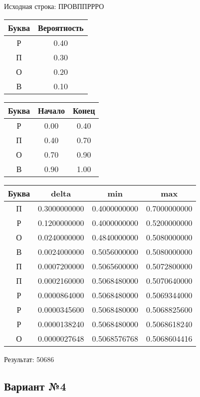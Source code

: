 \documentclass[a4paper, 12pt]{article}
\begin{document}
Исходная строка: ПРОВППРРРО\
\begin{center}
 \begin{tabular}{ |c|c| } 
  \hline
     Буква & Вероятность \\ \hline
Р & 0.40\\\hline
П & 0.30\\\hline
О & 0.20\\\hline
В & 0.10
\\ \hline \end{tabular}
\end{center}
\begin{center}
 \begin{tabular}{ |c|c|c| } 
  \hline
     Буква & Начало & Конец \\ \hline
Р & 0.00 & 0.40\\\hline
П & 0.40 & 0.70\\\hline
О & 0.70 & 0.90\\\hline
В & 0.90 & 1.00
\\ \hline \end{tabular}
\end{center}
\begin{center}
 \begin{tabular}{ |c|c|c|c| } 
  \hline
     Буква & delta & min & max \\ \hline
П & 0.3000000000 & 0.4000000000 & 0.7000000000\\\hline
Р & 0.1200000000 & 0.4000000000 & 0.5200000000\\\hline
О & 0.0240000000 & 0.4840000000 & 0.5080000000\\\hline
В & 0.0024000000 & 0.5056000000 & 0.5080000000\\\hline
П & 0.0007200000 & 0.5065600000 & 0.5072800000\\\hline
П & 0.0002160000 & 0.5068480000 & 0.5070640000\\\hline
Р & 0.0000864000 & 0.5068480000 & 0.5069344000\\\hline
Р & 0.0000345600 & 0.5068480000 & 0.5068825600\\\hline
Р & 0.0000138240 & 0.5068480000 & 0.5068618240\\\hline
О & 0.0000027648 & 0.5068576768 & 0.5068604416
\\ \hline \end{tabular}
\end{center}
Результат: 50686
\pagebreak
\subsection{Вариант №4}
\end{document}
